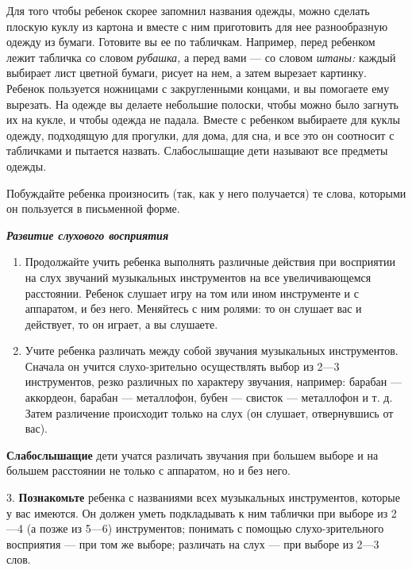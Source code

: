 \documentclass{book}
\renewcommand{\emph}[1]{\textit{#1}}
\begin{document}
Для того чтобы ребенок скорее запомнил названия одежды, можно сделать
плоскую куклу из картона и вместе с ним приготовить для нее
разнообразную одежду из бумаги. Готовите вы ее по табличкам. Например,
перед ребенком лежит табличка со словом \emph{рубашка,} а перед вами ---
со словом \emph{штаны:} каждый выбирает лист цветной бумаги, рисует на
нем, а затем вырезает картинку. Ребенок пользуется ножницами с
закругленными концами, и вы помогаете ему вырезать. На одежде вы делаете
небольшие полоски, чтобы можно было загнуть их на кукле, и чтобы одежда
не падала. Вместе с ребенком выбираете для куклы одежду, подходящую для
прогулки, для дома, для сна, и все это он соотносит с табличками и
пытается назвать. Слабослышащие дети называют все предметы одежды.

Побуждайте ребенка произносить (так, как у него получается) те слова,
которыми он пользуется в письменной форме.

\emph{\textbf{Развитие слухового восприятия}}


\begin{enumerate}
\def\labelenumi{\arabic{enumi}.}
\item
  
  Продолжайте учить ребенка выполнять различные действия при восприятии
  на слух звучаний музыкальных инструментов на все увеличивающемся
  расстоянии. Ребенок слушает игру на том или ином инструменте и с
  аппаратом, и без него. Меняйтесь с ним ролями: то он слушает вас и
  действует, то он играет, а вы слушаете.
  
\item
  
  Учите ребенка различать между собой звучания музыкальных инструментов.
  Сначала он учится слухо-зрительно осуществлять выбор из 2---3
  инструментов, резко различных по характеру звучания, например: барабан
  --- аккордеон, барабан --- металлофон, бубен --- свисток ---
  металлофон и т. д. Затем различение происходит только на слух (он
  слушает, отвернувшись от вас).
  
\end{enumerate}


\textbf{Слабослышащие} дети учатся различать звучания при большем выборе
и на большем расстоянии не только с аппаратом, но и без него.

3. \textbf{Познакомьте} ребенка с названиями всех музыкальных
инструментов, которые у вас имеются. Он должен уметь подкладывать к ним
таблички при выборе из 2---4 (а позже из 5---6) инструментов; понимать с
помощью слухо-зрительного восприятия --- при том же выборе; различать на
слух --- при выборе из 2---3 слов.
\end{document}
